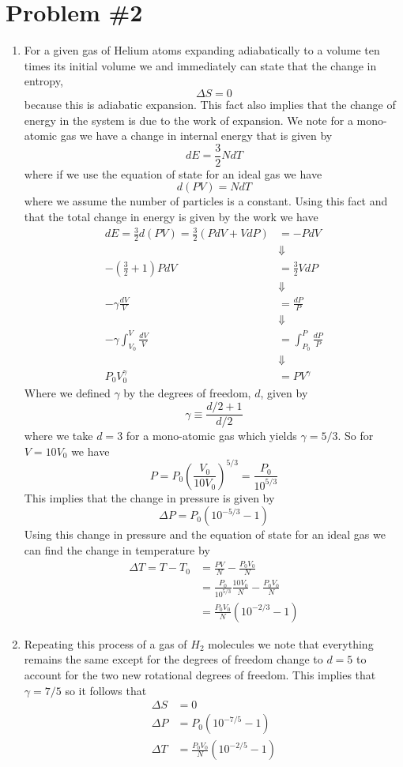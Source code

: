 \documentclass[11pt]{article}
\numberwithin{equation}{section}
\begin{document}
\pagebreak

\section{Problem \#2}
\begin{enumerate}[(1)]
\item For a given gas of Helium atoms expanding adiabatically to a volume ten times its 
initial volume we and immediately can state that the change in entropy, 
$$\Delta{S}=0$$
because this is adiabatic expansion. This fact also implies that the change of energy in the
system is due to the work of expansion. We note for a mono-atomic gas we have a change in
internal energy that is given by
$$dE = \frac{3}{2}NdT$$
where if we use the equation of state for an ideal gas we have
$$d(PV) = NdT$$
where we assume the number of particles is a constant. Using this fact and that the total 
change in energy is given by the work we have
\begin{align*}
dE = \frac{3}{2}d(PV) = \frac{3}{2}(PdV+VdP) &= -PdV\\
&\Downarrow\\
-\left(\frac{3}{2}+1\right)PdV &= \frac{3}{2}VdP\\
&\Downarrow\\
-\gamma\frac{dV}{V} &= \frac{dP}{P}\\
&\Downarrow\\
-\gamma\int_{V_0}^{V}\frac{dV}{V} &= \int_{P_0}^{P}\frac{dP}{P}\\
&\Downarrow\\
P_0V_0^{\gamma} &= PV^{\gamma}
\end{align*}
Where we defined $\gamma$ by the degrees of freedom, $d$, given by
$$\gamma\equiv\frac{d/2 + 1}{d/2}$$
where we take $d=3$ for a mono-atomic gas which yields $\gamma=5/3$. So for $V=10V_0$ we have
$$P = P_0\left(\frac{V_0}{10V_0}\right)^{5/3} = \frac{P_0}{10^{5/3}}$$
This implies that the change in pressure is given by
$$\Delta{P} = P_0\left(10^{-5/3}-1\right)$$
Using this change in pressure and the equation of state for an ideal gas we can find the 
change in temperature by 
\begin{align*}
\Delta{T} = T - T_0 &=  \frac{PV}{N} - \frac{P_0V_0}{N}\\
&=  \frac{P_0}{10^{5/3}}\frac{10V_0}{N} - \frac{P_0V_0}{N} \\
&= \frac{P_0V_0}{N}\left(10^{-2/3} - 1\right)
\end{align*}

\item Repeating this process of a gas of $H_2$ molecules we note that everything remains the
same except for the degrees of freedom change to $d=5$ to account for the two new rotational
degrees of freedom. This implies that $\gamma = 7/5$ so it follows that
\begin{align*}
\Delta{S} &= 0\\
\Delta{P} &= P_0\left(10^{-7/5}-1\right)\\
\Delta{T} &= \frac{P_0V_0}{N}\left(10^{-2/5} - 1\right)
\end{align*}


\end{enumerate}
\end{document}

